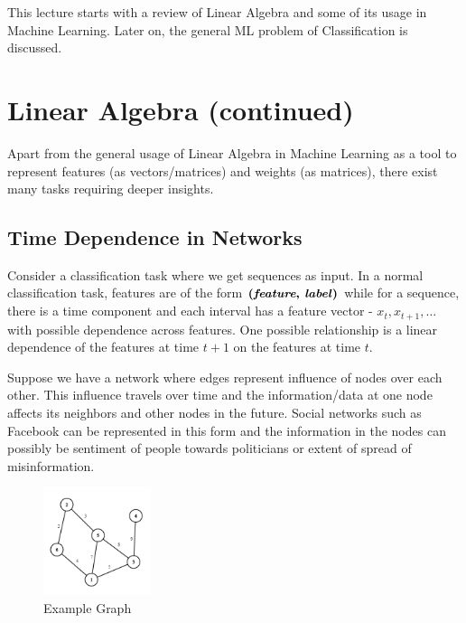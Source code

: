 \documentclass[12pt]{article}
\begin{document}
	\MakeScribeTop


This lecture starts with a review of Linear Algebra and some of its usage in Machine Learning. Later on, the general ML problem of Classification is discussed.

\section{Linear Algebra (continued)}
Apart from the general usage of Linear Algebra in Machine Learning as a tool to represent features (as vectors/matrices) and weights (as matrices), there exist many tasks requiring deeper insights.

\subsection{Time Dependence in Networks}
Consider a classification task where we get sequences as input. In a normal classification task, features are of the form $\textbf{(\textit{feature}, \textit{label})}$ while for a sequence, there is a time component and each interval has a feature vector - $x_t, x_{t+1}, \dots$ with possible dependence across features. One possible relationship is a linear dependence of the features at time $t+1$ on the features at time $t$.

Suppose we have a network where edges represent influence of nodes over each other. This influence travels over time and the information/data at one node affects its neighbors and other nodes in the future. Social networks such as Facebook can be represented in this form and the information in the nodes can possibly be sentiment of people towards politicians or extent of spread of misinformation.

\begin{figure}
  \begin{center}
    \includegraphics[width=0.28\textwidth]{graph.PNG}
  \end{center}
  \caption{Example Graph}
\end{figure}
\end{document}
